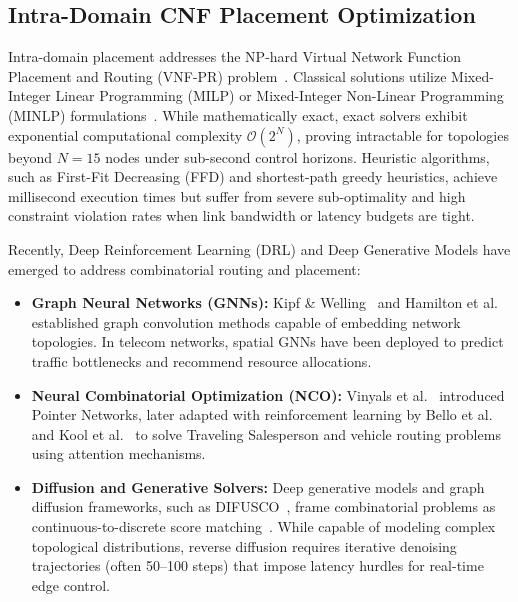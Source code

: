 \documentclass[conference]{IEEEtran}
\begin{document}
\subsection{Intra-Domain CNF Placement Optimization}
Intra-domain placement addresses the NP-hard Virtual Network Function Placement and Routing (VNF-PR) problem~\cite{herrera2016resource}. Classical solutions utilize Mixed-Integer Linear Programming (MILP) or Mixed-Integer Non-Linear Programming (MINLP) formulations~\cite{beal2018gekko}. While mathematically exact, exact solvers exhibit exponential computational complexity $\mathcal{O}(2^N)$, proving intractable for topologies beyond $N=15$ nodes under sub-second control horizons. Heuristic algorithms, such as First-Fit Decreasing (FFD) and shortest-path greedy heuristics, achieve millisecond execution times but suffer from severe sub-optimality and high constraint violation rates when link bandwidth or latency budgets are tight.

Recently, Deep Reinforcement Learning (DRL) and Deep Generative Models have emerged to address combinatorial routing and placement:
\begin{itemize}
    \item \textbf{Graph Neural Networks (GNNs):} Kipf \& Welling~\cite{kipf2017semi} and Hamilton et al.~\cite{hamilton2017inductive} established graph convolution methods capable of embedding network topologies. In telecom networks, spatial GNNs have been deployed to predict traffic bottlenecks and recommend resource allocations.
    \item \textbf{Neural Combinatorial Optimization (NCO):} Vinyals et al.~\cite{vinyals2015pointer} introduced Pointer Networks, later adapted with reinforcement learning by Bello et al.~\cite{bello2016neural} and Kool et al.~\cite{kool2018attention} to solve Traveling Salesperson and vehicle routing problems using attention mechanisms.
    \item \textbf{Diffusion and Generative Solvers:} Deep generative models and graph diffusion frameworks, such as DIFUSCO~\cite{sun2023difusco}, frame combinatorial problems as continuous-to-discrete score matching~\cite{ho2020denoising, song2020score}. While capable of modeling complex topological distributions, reverse diffusion requires iterative denoising trajectories (often 50--100 steps) that impose latency hurdles for real-time edge control.
\end{itemize}
\end{document}
